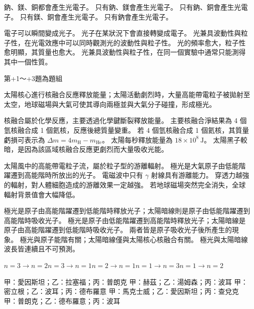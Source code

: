 \documentclass[10pt,a4paper]{article}
\begin{document}
{鈉、鎂、銅都會產生光電子。}
{只有鈉、鎂會產生光電子。}
{只有鈉、銅會產生光電子。}
{只有鎂、銅會產生光電子。}
{只有鈉會產生光電子。}

{電子可以瞬間變成光子。}
{光子在某狀況下會直接轉變成電子。}
{光兼具波動性與粒子性，在光電效應中可以同時觀測光的波動性與粒子性。}
{光的頻率愈大，粒子性愈明顯，其質量也愈大。}
{光兼具波動性與粒子性，在同一個實驗中通常只能測得其中一個性質。}

\noindent 第\the\numexpr\value{qcount}+1\relax ～\the\numexpr\value{qcount}+3\relax 題為題組

太陽核心進行核融合反應釋放能量；太陽活動劇烈時，大量高能帶電粒子被拋射至太空，地球磁場與大氣可使其導向兩極並與大氣分子碰撞，形成極光。

{核融合屬於化學反應，主要透過化學鍵斷裂釋放能量。}
{主要核融合淨結果為 4 個氫核融合成 1 個氦核，反應後總質量變重。}
{若 4 個氫核融合成 1 個氦核，其質量虧損可表示為 $\Delta m=4m_{\mathrm{H}}-m_{\mathrm{He}}$。}
{太陽每秒釋放能量為 $18\times 10^8\ \mathrm{J}$。}
{太陽黑子較暗，是因為該區域核融合反應更劇烈而大量吸收光能。}

{太陽風中的高能帶電粒子流，屬於粒子型的游離輻射。}
{極光是大氣原子由低能階躍遷到高能階時所放出的光子。}
{電磁波中只有 $\gamma$ 射線具有游離能力。}
{穿透力越強的輻射，對人體細胞造成的游離效果一定越強。}
{若地球磁場突然完全消失，全球輻射背景值會大幅降低。}

{極光是原子由高能階躍遷到低能階時釋放光子；太陽暗線則是原子由低能階躍遷到高能階時吸收光子。}
{極光是原子由低能階躍遷到高能階時釋放光子；太陽暗線是原子由高能階躍遷到低能階時吸收光子。}
{兩者皆是原子吸收光子後所產生的現象。}
{極光與原子能階有關；太陽暗線僅與太陽核心核融合有關。}
{極光與太陽暗線波長皆連續且不可預測。}

{$n=3\to n=2$}{$n=3\to n=1$}{$n=2\to n=1$}{$n=1\to n=3$}{$n=1\to n=2$}

{甲：愛因斯坦；乙：拉塞福；丙：普朗克}
{甲：赫茲；乙：湯姆森；丙：波耳}
{甲：密立根；乙：波耳；丙：德布羅意}
{甲：馬克士威；乙：愛因斯坦；丙：查兌克}
{甲：普朗克；乙：德布羅意；丙：波耳}
\end{document}
